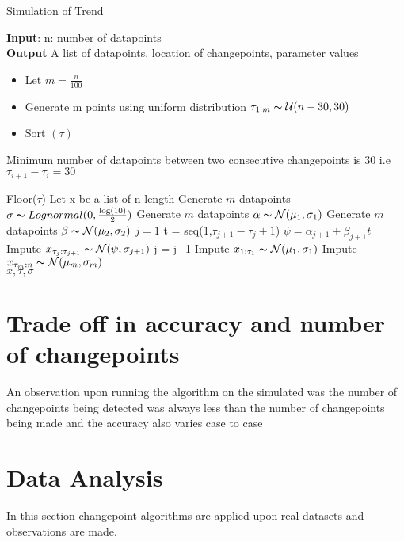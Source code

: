 \documentclass{article}
\newcommand\tab[1][0.4cm]{\hspace*{#1}}
\begin{document}
\begin{algorithm}
\caption{Simulation of Trend}\label{alg:cap}
\textbf{Input}: n: number of datapoints\\
\textbf{Output} A list of datapoints, location of changepoints, parameter values
\begin{algorithmic}
\begin{itemize}
    \item  Let $ m = \frac{n}{100}$
    \item  Generate m points using uniform distribution $\tau_{1:m} \thicksim \mathcal{U} (n-30,30)$ 
    \item  Sort $(\tau)$
\end{itemize}
     \Ensure Minimum number of datapoints between two consecutive changepoints \tab \tab \tab \tab \quad is 30 i.e $\tau_{i+1} - \tau_{i} = 30$ 

\State Floor($\tau$)
\State Let x be a list of n length
\State Generate $m$ datapoints $\sigma \thicksim Lognormal(0,\frac{\log(10)}{2})$
\State Generate $m$ datapoints $\alpha \thicksim \mathcal{N}(\mu_{1},\sigma_{1})$
\State Generate $m$ datapoints $\beta \thicksim \mathcal{N}(\mu_{2},\sigma_{2})$
\State $j = 1$
    \State t = seq(1,$\tau_{j+1} - \tau_{j} + 1$)
    \State $\psi  = \alpha_{j+1} + \beta_{j+1}t$
    \State Impute  $x_{\tau_{j} : \tau_{j+1}} \thicksim \mathcal{N}(\psi,\sigma_{j+1})$
    \State j = j+1
\EndWhile
\State Impute $x_{1:\tau_{1}} \thicksim \mathcal{N}(\mu_{1},\sigma_{1})$
\State Impute $x_{\tau_{m}:n} \thicksim \mathcal{N}(\mu_{m},\sigma_{m})$ \\
\Return $x,\tau,\sigma$
\end{algorithmic}
\end{algorithm}

\section{Trade off in accuracy and number of changepoints}
An observation upon running the algorithm on the simulated was the number of changepoints being detected was always less than the number of changepoints being made and the accuracy also varies case to case


\section{Data Analysis}
In this section changepoint algorithms are applied upon real datasets and observations are made.

\printindex


\end{document}
